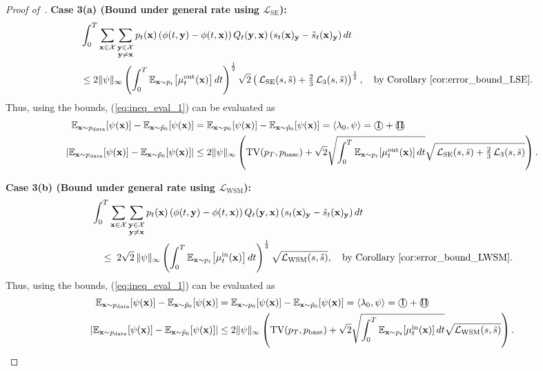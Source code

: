 \documentclass{article} %
\def\eqref#1{equation~\ref{#1}}
\newcommand{\bfx}{{\bf x}}
\newcommand{\bfy}{ {\bf y}}
\newcommand{\TV}{\mathrm{TV}}
\newcommand{\cI}{\text{\textcircled{I}}}
\newcommand{\cII}{\text{\textcircled{II}}}
\newcommand{\LWSM}{\mathcal{L}_{\mathrm{WSM}}}
\newcommand{\LSE}{\mathcal{L}_{\mathrm{SE}}}
\renewcommand{\eqref}[1]{\textup{(\ref{#1})}}
\newcommand{\LThree}{\mathcal{L}_{3}}
\begin{document}
\begin{proof}[Proof of~]
\textbf{Case 3(a) (Bound under general rate using $\LSE$):} 
\begin{align*}
    &\int_0^T \sum_{\substack{\bfx\in\mathcal{X}}} \sum_{\substack{\bfy\in\mathcal{X} \\ \bfy\neq \bfx}}  p_t(\bfx) \left(\phi(t, \bfy)-\phi(t, \bfx) \right) Q_t(\bfy, \bfx) \left( s_t(\bfx)_\bfy - \tilde{s}_t(\bfx)_\bfy \right)  dt \\
    \quad & \leq 2 \| \psi\|_\infty 
    \left( \int_0^T \mathbb{E}_{\bfx \sim p_t}\!\left[ \mu^\mathrm{out}_t(\bfx) \right] dt \right)^{\frac{1}{2}} \sqrt{2}
    \left( \,\LSE(s, \tilde{s}) + \tfrac{2}{3}\,\LThree(s, \tilde{s}) \right)^{\frac{1}{2}}, \quad \text{by Corollary~\ref{cor:error_bound_LSE}}.
\end{align*}
Thus, 
using the bounds, \eqref{eq:ineq_eval_1} can be evaluated as
\begin{align}
    \mathbb{E}_{\bfx \sim p_{\mathrm{data}}}[\psi(\bfx)] - \mathbb{E}_{\bfx \sim \tilde{p}_0}[\psi(\bfx)]  &=  \mathbb{E}_{\bfx \sim p_{0}}[\psi(\bfx)] - \mathbb{E}_{\bfx \sim \tilde{p}_0}[\psi(\bfx)] = \langle \lambda_0, \psi \rangle = \cI + \cII \nonumber \\
    \left| \mathbb{E}_{\bfx \sim p_{\mathrm{data}}}[\psi(\bfx)] - \mathbb{E}_{\bfx \sim \tilde{p}_0}[\psi(\bfx)] \right| &\leq 2 \|\psi\|_\infty \left( \TV(p_T, p_{\rm base}) +  \sqrt{2} \sqrt{ \int_0^T \mathbb{E}_{\bfx \sim p_t}\!\left[ \mu^\mathrm{out}_t(\bfx) \right] dt }  \sqrt{\,\LSE(s, \tilde{s}) + \tfrac{2}{3}\,\LThree(s, \tilde{s})} \right) \nonumber.
\end{align}

\textbf{Case 3(b) (Bound under general rate using $\LWSM$):}
\begin{align*}
  & \int_0^T \sum_{\bfx\in\mathcal{X}} \sum_{\substack{\bfy\in\mathcal{X} \\ \bfy\neq \bfx}} 
    p_t(\bfx) \left(\phi(t, \bfy)-\phi(t, \bfx) \right) Q_t(\bfy, \bfx) 
    \left( s_t(\bfx)_\bfy - \tilde{s}_t(\bfx)_\bfy \right) dt  \\
  &\quad\leq\; 2\sqrt{2}\, \| \psi\|_\infty 
    \left( \int_0^T \mathbb{E}_{\bfx \sim p_t}\!\left[ \mu^\mathrm{in}_t(\bfx) \right] dt \right)^{\frac{1}{2}}
    \sqrt{\LWSM(s, \tilde{s})}, \quad \text{by Corollary~\ref{cor:error_bound_LWSM}}.
\end{align*}
Thus, 
using the bounds, \eqref{eq:ineq_eval_1} can be evaluated as
\begin{align}
    \mathbb{E}_{\bfx \sim p_{\mathrm{data}}}[\psi(\bfx)] - \mathbb{E}_{\bfx \sim \tilde{p}_0}[\psi(\bfx)]  &=  \mathbb{E}_{\bfx \sim p_{0}}[\psi(\bfx)] - \mathbb{E}_{\bfx \sim \tilde{p}_0}[\psi(\bfx)] = \langle \lambda_0, \psi \rangle = \cI + \cII \nonumber \\
    \left| \mathbb{E}_{\bfx \sim p_{\mathrm{data}}}[\psi(\bfx)] - \mathbb{E}_{\bfx \sim \tilde{p}_0}[\psi(\bfx)] \right| &\leq 2 \|\psi\|_\infty \left( \TV(p_T, p_{\rm base}) +  \sqrt{2} \sqrt{ \int_0^T \mathbb{E}_{\bfx \sim p_t}\!\left[ \mu^\mathrm{in}_t(\bfx) \right] dt }  \sqrt{\LWSM(s, \tilde{s})} \right) \nonumber.
\end{align}
\end{proof}
\end{document}
